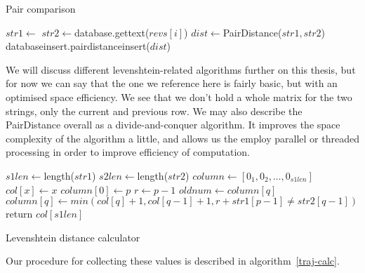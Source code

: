 \begin{algorithm}[p]
\caption{Pair comparison}\label{pair-comp}
  \begin{algorithmic}[5]
    \State $str1 \gets $
    \State $str2 \gets $database.gettext($revs[i]$)
    \State $dist \gets $PairDistance($str1, str2$)
    \State databaseinsert.pairdistanceinsert($dist$)  
    \EndIf
    \EndFor
  \EndProcedure
  \end{algorithmic}
\end{algorithm}

We will discuss different levenshtein-related algorithms further on
this thesis, but for now we can say that the one we reference here is
fairly basic, but with an optimised space efficiency. We see that we
don't hold a whole matrix for the two strings, only the current and
previous row. We may also describe the PairDistance overall as a
divide-and-conquer algorithm. It improves the space complexity of the
algorithm a little, and allows us the employ parallel or threaded
processing in order to improve efficiency of computation.

\begin{algorithm}
  \begin{algorithmic}[5]
    \State $s1len \gets $length($str1$)
    \State $s2len \gets $length($str2$)
    \State $column \gets [0_{1}, 0_{2}, \ldots, 0_{s1len}]$
    \State $col[x] \gets x$
    \EndFor
    \State $column[0] \gets p$
    \State $r \gets p-1$
    \State $oldnum \gets column[q]$
    \State $column[q] \gets min(col[q]+1, col[q-1] + 1, r + str1[p-1] \neq str2[q-1])$
    \EndFor
    \EndFor
    \State return $col[s1len]$
    \EndFunction
  \end{algorithmic}
  \caption{Levenshtein distance calculator}
  \label{lev-dist}
\end{algorithm}

Our procedure for collecting these values is described in
algorithm~\ref{traj-calc}.

